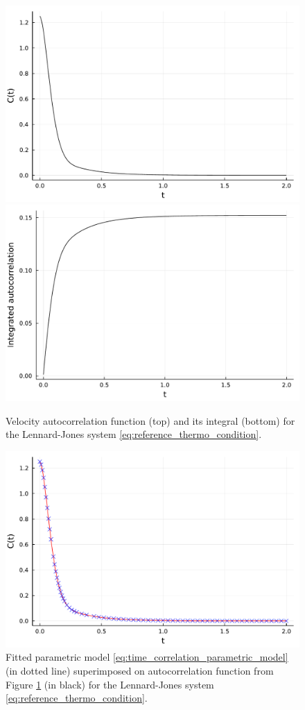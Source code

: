 \begin{figure}[htbp]
    \begin{center}
      \includegraphics[width=0.7\linewidth]{figures/autocorr.pdf}
      \includegraphics[width=0.7\linewidth]{figures/int_autocorr.pdf}
      \caption{ \label{fig:gk_mobility}
        Velocity autocorrelation function (top) and its integral (bottom) for the Lennard-Jones system \eqref{eq:reference_thermo_condition}.
      }
    \end{center}
  \end{figure}

  \begin{figure}[htbp]
    \begin{center}
      \includegraphics[width=0.8\linewidth]{figures/autocorr_fit.pdf}
      \caption{ \label{fig:fit_gk_mobility}
        Fitted parametric model \eqref{eq:time_correlation_parametric_model} (in dotted line) superimposed on autocorrelation function from Figure \ref{fig:gk_mobility} (in black) for the Lennard-Jones system \eqref{eq:reference_thermo_condition}.
      }
    \end{center}
  \end{figure}

